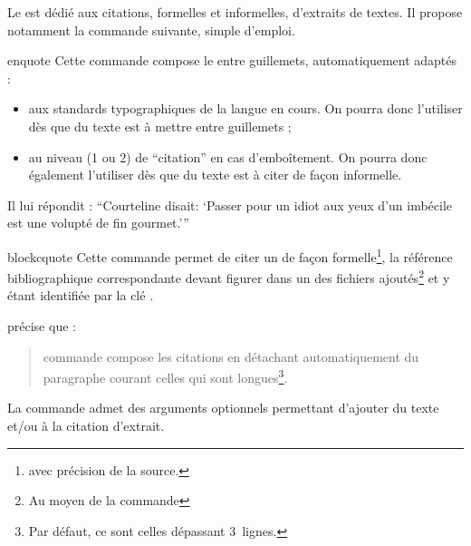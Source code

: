 \documentclass[french,nolocaltoc]{nwejmart}
\newtheorem[style=definition]{fait}
\newtheorem[title=expérience]{experience}
\newtheorem[title-plural=anneaux]{anneau}
\newtheorem[title=idéal,title-plural=idéaux]{ideal}
\begin{document}
Le  est dédié aux citations, formelles et informelles,
d'extraits de textes. Il propose notamment la commande 
suivante, simple d'emploi.

\begin{docCommand}{enquote}{}
  Cette commande compose le  entre guillemets, automatiquement
  adaptés :
  \begin{itemize}
  \item aux standards typographiques de la langue en cours. On pourra donc
    l'utiliser dès que du texte est à mettre entre guillemets ;
  \item au niveau (1 ou 2) de \enquote{citation} en cas d'emboîtement. On
    pourra donc également l'utiliser dès que du texte est à citer de façon
    informelle.
  \end{itemize}
\begin{bodycode}[listing and text,listing options={alsolanguage={[csquotes]TeX}}]
Il lui répondit : \enquote{Courteline disait: \enquote{Passer
    pour un idiot aux yeux d'un imbécile est une volupté de fin
    gourmet.}}
\end{bodycode}
\end{docCommand}

\begin{docCommand}{blockcquote}{}
  Cette commande permet de citer un  de façon
  formelle\footnote{\Ie*{} avec précision de la source.}, la référence
  bibliographique correspondante devant figurer dans un des fichiers 
  ajoutés\footnote{Au moyen de la commande } et
  y étant identifiée par la clé .

\renewcommand{\thempfootnote}{\arabic{mpfootnote}}
\begin{bodycode}[listing and text,listing options={alsolanguage={[biblatex]TeX},alsolanguage={[csquotes]TeX},deletekeywords={[3]footnote}}]
\citeauthor{Bitouze} précise que :
\blockcquote{Bitouze}{%
   commande compose les citations en détachant
  automatiquement du paragraphe courant celles qui sont
  longues\footnote{Par défaut, ce sont celles
    dépassant 3~lignes.}.%
}.
\end{bodycode}
\renewcommand{\thempfootnote}{\alph{mpfootnote}}
\end{docCommand}

La commande  admet des arguments optionnels permettant
d'ajouter du texte  et/ou  à la citation
d'extrait\autocite[Pour plus de détails, cf. par exemple][]{Bitouze}.
\end{document}
